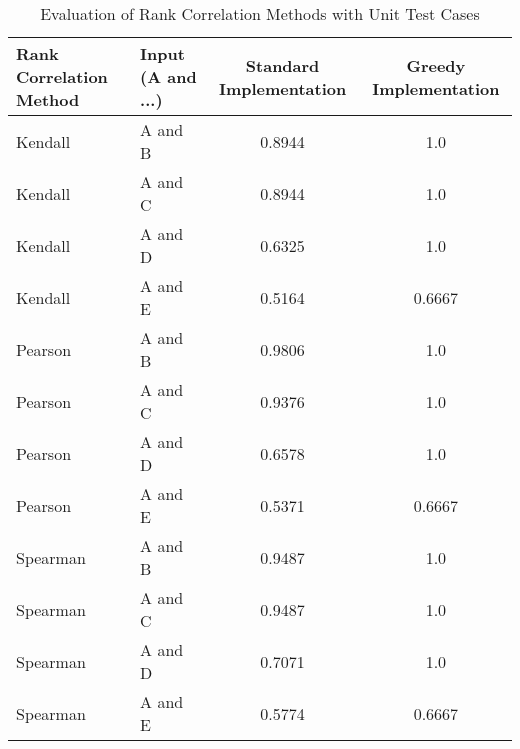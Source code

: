 \begin{table}[h!]
    \centering
    \caption{Evaluation of Rank Correlation Methods with Unit Test Cases}
    \begin{tabular}{@{}llcc@{}}
        \toprule
        \textbf{Rank Correlation Method} & \textbf{Input (A and ...)} & \textbf{Standard Implementation} & \textbf{Greedy Implementation} \\ \midrule
        Kendall                        & A and B                   & 0.8944                          & 1.0                            \\
        Kendall                        & A and C                   & 0.8944                          & 1.0                            \\
        Kendall                        & A and D                   & 0.6325                          & 1.0                            \\
        Kendall                        & A and E                   & 0.5164                          & 0.6667                         \\ \midrule
        Pearson                        & A and B                   & 0.9806                          & 1.0                            \\
        Pearson                        & A and C                   & 0.9376                          & 1.0                            \\
        Pearson                        & A and D                   & 0.6578                          & 1.0                            \\
        Pearson                        & A and E                   & 0.5371                          & 0.6667                         \\ \midrule
        Spearman                       & A and B                   & 0.9487                          & 1.0                            \\
        Spearman                       & A and C                   & 0.9487                          & 1.0                            \\
        Spearman                       & A and D                   & 0.7071                          & 1.0                            \\
        Spearman                       & A and E                   & 0.5774                          & 0.6667                         \\ \bottomrule
    \end{tabular}
\end{table}

